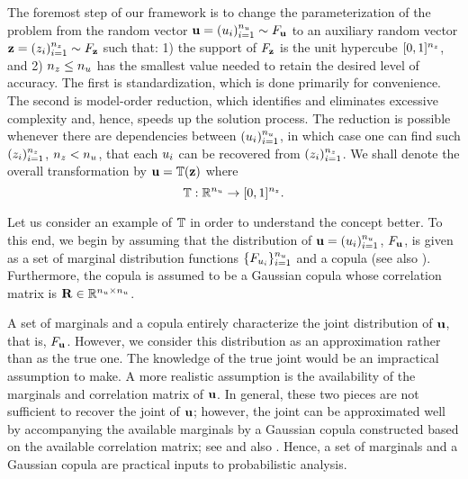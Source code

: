 The foremost step of our framework is to change the parameterization of the
problem from the random vector $\mathbf{u} = (u_i)_{i = 1}^{n_u} \sim F_{\mathbf{u}}$
to an auxiliary random vector $\mathbf{z} = (z_i)_{i = 1}^{n_z} \sim F_{\mathbf{z}}$
such that: 1) the support of $F_{\mathbf{z}}$ is the unit hypercube $[0,
1]^{n_z}$, and 2) ${n_z} \leq {n_u}$ has the smallest value needed to retain the
desired level of accuracy. The first is standardization, which is done primarily
for convenience. The second is model-order reduction, which identifies and
eliminates excessive complexity and, hence, speeds up the solution process. The
reduction is possible whenever there are dependencies between $(u_i)_{i =
1}^{n_u}$, in which case one can find such $(z_i)_{i = 1}^{n_z}$, ${n_z} < {n_u}$, that
each $u_i$ can be recovered from $(z_i)_{i = 1}^{n_z}$. We shall denote the
overall transformation by $\mathbf{u} = \mathbb{T}(\mathbf{z})$ where
\begin{equation} \elab{transformation}
  \transformation: \real^\nu \to [0, 1]^\nz.
\end{equation}

Let us consider an example of $\mathbb{T}$ in order to understand the
concept better. To this end, we begin by assuming that the distribution of $\mathbf{u}
= (u_i)_{i = 1}^{n_u}$, $F_{\mathbf{u}}$, is given as a set of marginal
distribution functions $\{ F_{u_i} \}_{i = 1}^{n_u}$ and a copula
\cite{nelsen2006} (see also ). Furthermore, the copula is
assumed to be a Gaussian copula whose correlation matrix is $\mathbf{R} \in
\mathbb{R}^{{n_u} \times {n_u}}$.

\begin{remark}
A set of marginals and a copula entirely characterize the joint distribution of
$\mathbf{u}$, that is, $F_{\mathbf{u}}$. However, we consider this distribution as
an approximation rather than as the true one. The knowledge of the true joint
would be an impractical assumption to make. A more realistic assumption is the
availability of the marginals and correlation matrix of $\mathbf{u}$. In general, these
two pieces are not sufficient to recover the joint of $\mathbf{u}$; however, the joint
can be approximated well by accompanying the available marginals by a Gaussian
copula constructed based on the available correlation matrix; see \cite{liu1986}
and also \cite{ukhov2014}. Hence, a set of marginals and a Gaussian copula are
practical inputs to probabilistic analysis.
\end{remark}


